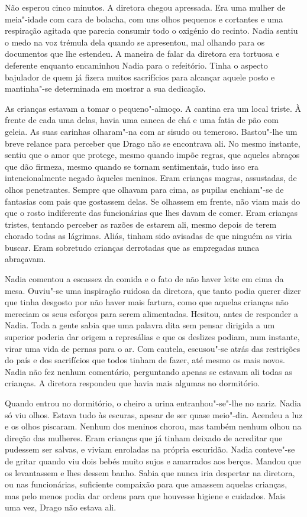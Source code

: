 Não esperou cinco minutos. A diretora chegou apressada. Era uma
mulher de meia"-idade com cara de bolacha, com uns olhos pequenos e
cortantes e uma respiração agitada que parecia consumir todo o oxigénio
do recinto. Nadia sentiu o medo na voz trémula dela quando se apresentou, mal olhando para os documentos que lhe estendeu. A maneira de
falar da diretora era tortuosa e deferente enquanto encaminhou Nadia
para o refeitório. Tinha o aspecto bajulador de quem já fizera muitos
sacrifícios para alcançar aquele posto e mantinha"-se determinada em mostrar a sua dedicação.

As crianças estavam a tomar o pequeno"-almoço. A cantina era um local
triste. À frente de cada uma delas, havia uma caneca de chá e uma fatia
de pão com geleia. As suas carinhas olharam"-na com ar sisudo ou
temeroso. Bastou"-lhe um breve relance para perceber que Drago não se encontrava ali. No
mesmo instante, sentiu que o amor que protege, mesmo quando impõe
regras, que aqueles abraços que dão firmeza, mesmo quando se tornam
sentimentais, tudo isso era intencionalmente negado àqueles meninos.
Eram crianças magras, assustadas, de olhos penetrantes. Sempre que
olhavam para cima, as pupilas enchiam"-se de fantasias com pais que
gostassem delas. Se olhassem em frente, não viam mais do que o rosto
indiferente das funcionárias que lhes davam de comer. Eram crianças
tristes, tentando perceber as razões de estarem ali, mesmo depois de
terem chorado todas as lágrimas. Aliás, tinham sido avisadas de que
ninguém as viria buscar. Eram sobretudo crianças derrotadas que as
empregadas nunca abraçavam.

Nadia comentou a escassez da comida e o fato de não haver leite em cima
da mesa. Ouviu"-se uma inspiração ruidosa da diretora, que tanto podia
querer dizer que tinha desgosto por não haver mais fartura, como que
aquelas crianças não mereciam os seus esforços para serem alimentadas.
Hesitou, antes de responder a Nadia. Toda a gente sabia que uma palavra
dita sem pensar dirigida a um superior poderia dar origem a represálias
e que os deslizes podiam, num instante, virar uma vida de pernas para o
ar. Com cautela, escusou"-se atrás das restrições do país e dos
sacrifícios que todos tinham de fazer, até mesmo os mais novos. Nadia
não fez nenhum comentário, perguntando apenas se estavam ali todas as
crianças. A diretora respondeu que havia mais algumas no dormitório.

Quando entrou no dormitório, o cheiro a urina entranhou"-se"-lhe no nariz. Nadia só viu olhos. Estava tudo às escuras,
apesar de ser quase meio"-dia. Acendeu a luz e os olhos piscaram. Nenhum
dos meninos chorou, mas também nenhum olhou na direção das mulheres.
Eram crianças que já tinham deixado de acreditar que pudessem ser
salvas, e viviam enroladas na própria escuridão. Nadia conteve"-se de
gritar quando viu dois bebés muito sujos e amarrados aos berços. Mandou
que os levantassem e lhes dessem banho. Sabia que nunca iria despertar
na diretora, ou nas funcionárias, suficiente compaixão para que amassem aquelas crianças, mas pelo menos podia dar ordens para que houvesse
higiene e cuidados. Mais uma vez, Drago não estava ali.

